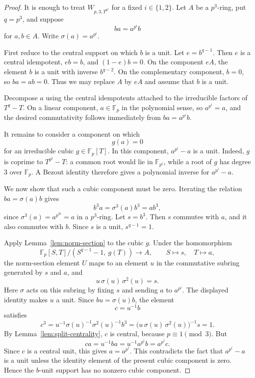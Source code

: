 \begin{proof}
  It is enough to treat \(W_{p,3,T^{p^i}}\) for a fixed \(i\in\{1,2\}\).  Let \(A\) be a \(p^3\)-ring, put \(q=p^3\), and suppose
  \[
    ba=a^{p^i}b
  \]
  for \(a,b\in A\).  Write \(\sigma(a)=a^{p^i}\).

  First reduce to the central support on which \(b\) is a unit.  Let \(e=b^{q-1}\).  Then \(e\) is a central idempotent, \(eb=b\), and \((1-e)b=0\).  On the component \(eA\), the element \(b\) is a unit with inverse \(b^{q-2}\).  On the complementary component, \(b=0\), so \(ba=ab=0\).  Thus we may replace \(A\) by \(eA\) and assume that \(b\) is a unit.

  Decompose \(a\) using the central idempotents attached to the irreducible factors of \(T^q-T\).  On a linear component, \(a\in\mathbb F_p\) in the polynomial sense, so \(a^{p^i}=a\), and the desired commutativity follows immediately from \(ba=a^{p^i}b\).

  It remains to consider a component on which
  \[
    g(a)=0
  \]
  for an irreducible cubic \(g\in\mathbb F_p[T]\).  In this component, \(a^{p^i}-a\) is a unit.  Indeed, \(g\) is coprime to \(T^{p^i}-T\): a common root would lie in \(\mathbb F_{p^i}\), while a root of \(g\) has degree \(3\) over \(\mathbb F_p\).  A Bezout identity therefore gives a polynomial inverse for \(a^{p^i}-a\).

  We now show that such a cubic component must be zero.  Iterating the relation \(ba=\sigma(a)b\) gives
  \[
    b^3a=\sigma^3(a)b^3=a b^3,
  \]
  since \(\sigma^3(a)=a^{p^{3i}}=a\) in a \(p^3\)-ring.  Let \(s=b^3\).  Then \(s\) commutes with \(a\), and it also commutes with \(b\).  Since \(s\) is a unit, \(s^{q-1}=1\).

  Apply Lemma~\ref{lem:norm-section} to the cubic \(g\).  Under the homomorphism
  \[
    \mathbb F_p[S,T]/(S^{q-1}-1,\ g(T))\longrightarrow A,
    \qquad
    S\longmapsto s,\quad T\longmapsto a,
  \]
  the norm-section element \(U\) maps to an element \(u\) in the commutative subring generated by \(s\) and \(a\), and
  \[
    u\,\sigma(u)\,\sigma^2(u)=s.
  \]
  Here \(\sigma\) acts on this subring by fixing \(s\) and sending \(a\) to \(a^{p^i}\).  The displayed identity makes \(u\) a unit.  Since \(bu=\sigma(u)b\), the element
  \[
    c=u^{-1}b
  \]
  satisfies
  \[
    c^3
    =u^{-1}\sigma(u)^{-1}\sigma^2(u)^{-1}b^3
    =\bigl(u\,\sigma(u)\,\sigma^2(u)\bigr)^{-1}s
    =1.
  \]
  By Lemma~\ref{lem:split-centrality}, \(c\) is central, because \(p\equiv 1 \pmod 3\).  But
  \[
    ca=u^{-1}ba=u^{-1}a^{p^i}b=a^{p^i}c.
  \]
  Since \(c\) is a central unit, this gives \(a=a^{p^i}\).  This contradicts the fact that \(a^{p^i}-a\) is a unit unless the identity element of the present cubic component is zero.  Hence the \(b\)-unit support has no nonzero cubic component.


\end{proof}

